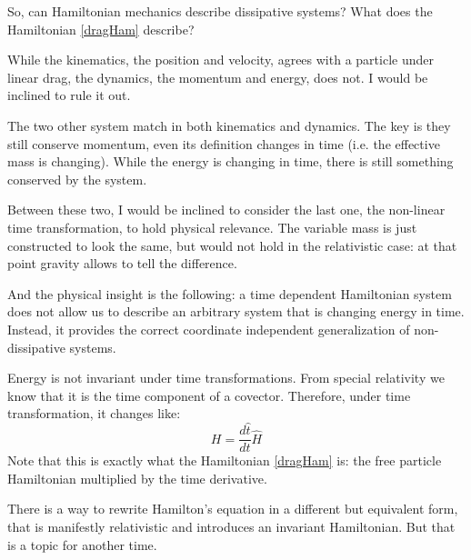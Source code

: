 \documentclass[aps,pra,10pt,twocolumn,floatfix,nofootinbib]{revtex4-1}
\theoremstyle{definition}
\begin{document}
So, can Hamiltonian mechanics describe dissipative systems? What does the Hamiltonian \eqref{dragHam} describe?

While the kinematics, the position and velocity, agrees with a particle under linear drag, the dynamics, the momentum and energy, does not. I would be inclined to rule it out.

The two other system match in both kinematics and dynamics. The key is they still conserve momentum, even its definition changes in time (i.e. the effective mass is changing). While the energy is changing in time, there is still something conserved by the system.

Between these two, I would be inclined to consider the last one, the non-linear time transformation, to hold physical relevance. The variable mass is just constructed to look the same, but would not hold in the relativistic case: at that point gravity allows to tell the difference.

And the physical insight is the following: a time dependent Hamiltonian system does not allow us to describe an arbitrary system that is changing energy in time. Instead, it provides the correct coordinate independent generalization of non-dissipative systems.

Energy is not invariant under time transformations. From special relativity we know that it is the time component of a covector. Therefore, under time transformation, it changes like:
\begin{equation}
H=\frac{d\hat{t}}{dt}\hat{H}
\end{equation}
Note that this is exactly what the Hamiltonian \eqref{dragHam} is: the free particle Hamiltonian multiplied by the time derivative.

There is a way to rewrite Hamilton's equation in a different but equivalent form, that is manifestly relativistic and introduces an invariant Hamiltonian. But that is a topic for another time.
\end{document}
